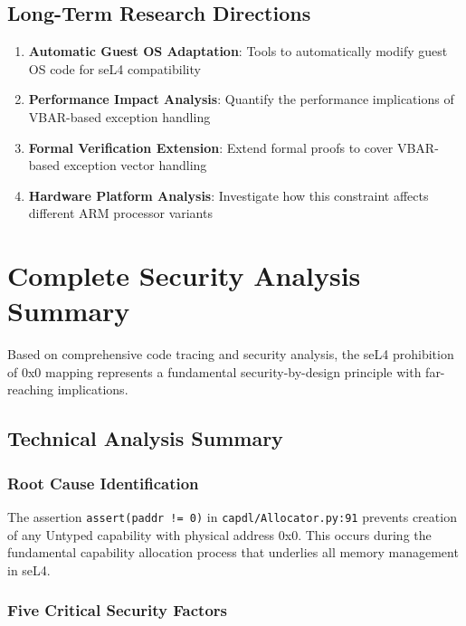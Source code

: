 \documentclass[11pt,a4paper]{article}
\begin{document}
\subsection{Long-Term Research Directions}

\begin{enumerate}
    \item \textbf{Automatic Guest OS Adaptation}: Tools to automatically modify guest OS code for seL4 compatibility
    \item \textbf{Performance Impact Analysis}: Quantify the performance implications of VBAR-based exception handling
    \item \textbf{Formal Verification Extension}: Extend formal proofs to cover VBAR-based exception vector handling
    \item \textbf{Hardware Platform Analysis}: Investigate how this constraint affects different ARM processor variants
\end{enumerate}

\section{Complete Security Analysis Summary}

Based on comprehensive code tracing and security analysis, the seL4 prohibition of 0x0 mapping represents a fundamental security-by-design principle with far-reaching implications.

\subsection{Technical Analysis Summary}

\subsubsection{Root Cause Identification}

The assertion \texttt{assert(paddr != 0)} in \texttt{capdl/Allocator.py:91} prevents creation of any Untyped capability with physical address 0x0. This occurs during the fundamental capability allocation process that underlies all memory management in seL4.

\subsubsection{Five Critical Security Factors}
\end{document}
